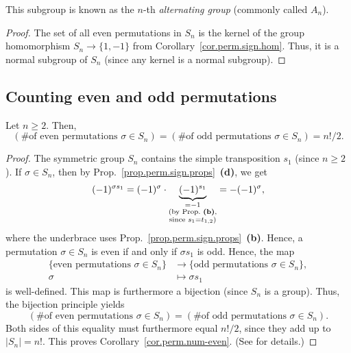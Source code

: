 This subgroup is known as the $n$-th \emph{alternating group} (commonly
called $A_n$).

\begin{proof}
The set of all even permutations in $S_n$ is the kernel of the group
homomorphism $S_n \to \{1, -1\}$ from Corollary~\ref{cor.perm.sign.hom}.
Thus, it is a normal subgroup of $S_n$ (since any kernel is a normal
subgroup).
\end{proof}

\subsection{Counting even and odd permutations}

\begin{corollary}
\label{cor.perm.num-even}
\leantarget
\leanok
Let $n \geq 2$. Then,
\[
\left(\text{\# of even permutations } \sigma \in S_n \right)
= \left(\text{\# of odd permutations } \sigma \in S_n \right)
= n!/2.
\]
\end{corollary}

\begin{proof}
The symmetric group $S_n$ contains the simple transposition $s_1$ (since
$n \geq 2$). If $\sigma \in S_n$, then
by Prop.~\ref{prop.perm.sign.props}~\textbf{(d)}, we get
\[
(-1)^{\sigma s_1}
= (-1)^{\sigma} \cdot \underbrace{(-1)^{s_1}}_{
\substack{= -1 \\ \text{(by Prop.~\textbf{(b)},} \\
\text{since } s_1 = t_{1,2}\text{)}}}
= -(-1)^{\sigma},
\]
where the underbrace uses Prop.~\ref{prop.perm.sign.props}~\textbf{(b)}.
Hence, a permutation $\sigma \in S_n$ is even if and only if $\sigma s_1$
is odd. Hence, the map
\begin{align*}
\{\text{even permutations } \sigma \in S_n\}
&\to \{\text{odd permutations } \sigma \in S_n\}, \\
\sigma &\mapsto \sigma s_1
\end{align*}
is well-defined. This map is furthermore a bijection (since $S_n$ is a
group). Thus, the bijection principle yields
\[
\left(\text{\# of even permutations } \sigma \in S_n \right)
= \left(\text{\# of odd permutations } \sigma \in S_n \right).
\]
Both sides of this equality must furthermore equal $n!/2$, since they add
up to $|S_n| = n!$. This proves Corollary~\ref{cor.perm.num-even}.
(See \cite[Exercise 5.4]{detnotes} for details.)
\end{proof}

